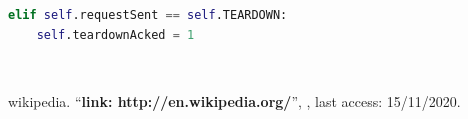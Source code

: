 \documentclass[a4paper]{article}
\begin{document}
\begin{lstlisting}[language=Python]
elif self.requestSent == self.TEARDOWN:
    self.teardownAcked = 1 
\end{lstlisting}
\\

\begin{thebibliography}{80}


 wikipedia.
``\textbf{link: http://en.wikipedia.org/}'',
\textit{}, last access: 15/11/2020.

\end{thebibliography}
\end{document}

